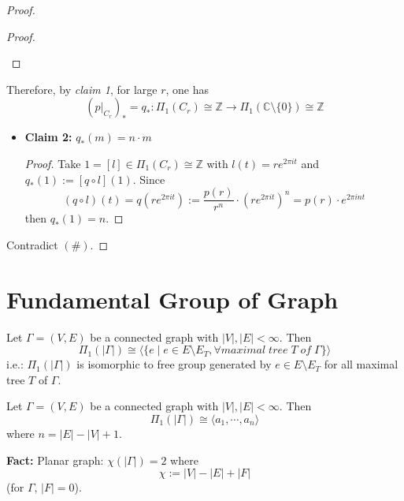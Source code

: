 \begin{proof}
\begin{itemize}
\begin{proof}
\begin{itemize}
            \end{itemize}
        \end{proof}
    \end{itemize}
    Therefore, by \textit{claim 1}, for large $r$, one has
    $$(p|_{C_r})_* = q_* : \Pi_1 (C_r) \cong \mathbb{Z} \to \Pi_1 (\mathbb{C} \setminus \{ 0\}) \cong \mathbb{Z}$$
    \begin{itemize}
        \item \textbf{Claim 2:} $q_* (m) = n \cdot m$
        \begin{proof}
            Take $1 = [l] \in \Pi_1 (C_r) \cong \mathbb{Z}$ with $l (t) = re^{2\pi it}$ and $q_*(1) := [q \circ l] (1)$. Since
            $$(q \circ l) (t) = q(r e^{2\pi it}) := \frac{p(r)}{r^n} \cdot (r e^{2\pi it})^n = p(r) \cdot e^{2\pi int}$$
            then $q_*(1) = n$.
        \end{proof}
    \end{itemize}
    Contradict $(\#)$.
\end{proof}

\section{Fundamental Group of Graph}

\begin{theorem}
    Let $\Gamma = (V,E)$ be a connected graph with $|V|,|E| < \infty$. Then
    $$\Pi_1 (|\Gamma|) \cong \langle \{ e \mid e \in E \setminus E_T,\forall maximal\;tree\;T\; of \;\Gamma \} \rangle$$
    i.e.: $\Pi_1 (|\Gamma|)$ is isomorphic to free group generated by $e \in E \setminus E_T$ for all maximal tree $T$ of $\Gamma$.
\end{theorem}

\begin{corollary}
    Let $\Gamma= (V,E)$ be a connected graph with $|V| , |E| < \infty$. Then
    $$\Pi_1 (| \Gamma|) \cong \langle a_1 ,\cdots, a_n \rangle$$
    where $n=|E| - |V|+1$.
\end{corollary}

\noindent\textbf{Fact:} Planar graph: $\chi (|\Gamma|) =2$ where
$$\chi := |V| - |E| + |F|$$
(for $\Gamma$, $|F| = 0$).

